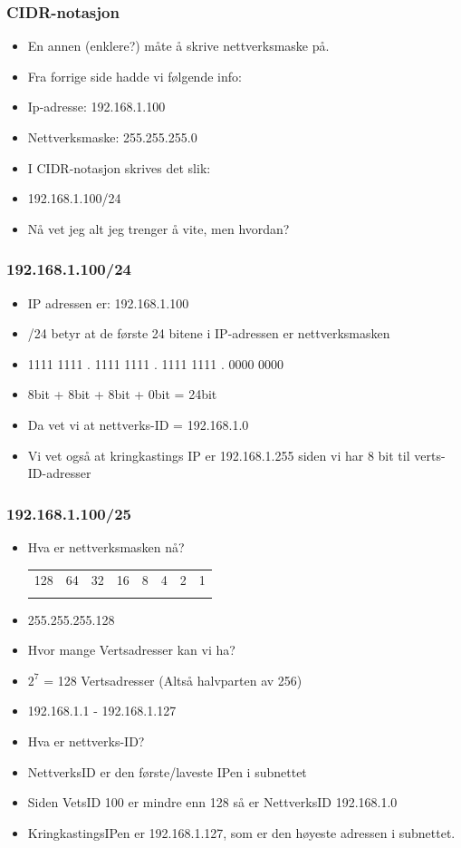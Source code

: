\documentclass[aspectratio=169,xcolor=dvipsnames]{beamer}
\begin{document}
\begin{frame}
	\frametitle{CIDR-notasjon}

			\begin{itemize}
				\item En annen (enklere?) måte å skrive nettverksmaske på.
				\item Fra forrige side hadde vi følgende info:
				\item Ip-adresse: 192.168.1.100
				\item Nettverksmaske: 255.255.255.0
				\item I CIDR-notasjon skrives det slik:
				\item 192.168.1.100/24
				\item Nå vet jeg alt jeg trenger å vite, men hvordan?
			\end{itemize}
\end{frame}
\begin{frame}
	\frametitle{192.168.1.100/24}

			\begin{itemize}
				\item IP adressen er: 192.168.1.100
				\item /24 betyr at de første 24 bitene i IP-adressen er nettverksmasken
				\item 1111 1111 . 1111 1111 . 1111 1111 . 0000 0000
				\item     8bit  +     8bit  +     8bit  +     0bit = 24bit 
				\item Da vet vi at nettverks-ID = 192.168.1.0
				\item Vi vet også at kringkastings IP er 192.168.1.255 siden vi har 8 bit til verts-ID-adresser
			\end{itemize}
\end{frame}
\begin{frame}
	\frametitle{192.168.1.100/25}

			\begin{itemize}
				\item Hva er nettverksmasken nå?
\begin{center}
\begin{tabular}{ c c c c c c c c}
128 & 64 	& 32 	& 16 	& 8  	& 4	& 2	&  1\\
 &  	&  	&  	&   	& 	& 	&  \\
\end{tabular}
\end{center}
				\item 255.255.255.128
				\item Hvor mange Vertsadresser kan vi ha?
				\item $2^7$ = 128 Vertsadresser (Altså halvparten av 256)
				\item 192.168.1.1 - 192.168.1.127
				\item Hva er nettverks-ID?
				\item NettverksID er den første/laveste IPen i subnettet
				\item Siden VetsID 100 er mindre enn 128 så er NettverksID 192.168.1.0
				\item KringkastingsIPen er 192.168.1.127, som er den høyeste adressen i subnettet.
			\end{itemize}
\end{frame}
\end{document}
